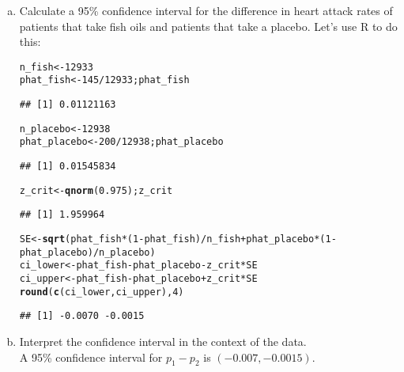 \documentclass[12pt, fleqn]{article}\usepackage[]{graphicx}\usepackage[]{color}
\makeatletter
\newcommand{\hlnum}[1]{\textcolor[rgb]{0.686,0.059,0.569}{#1}}%
\newcommand{\hlopt}[1]{\textcolor[rgb]{0,0,0}{#1}}%
\newcommand{\hlstd}[1]{\textcolor[rgb]{0.345,0.345,0.345}{#1}}%
\newcommand{\hlkwb}[1]{\textcolor[rgb]{0.69,0.353,0.396}{#1}}%
\newcommand{\hlkwd}[1]{\textcolor[rgb]{0.737,0.353,0.396}{\textbf{#1}}}%
\newenvironment{kframe}{%
 \def\at@end@of@kframe{}%
 \ifinner\ifhmode%
  \def\at@end@of@kframe{\end{minipage}}%
  \begin{minipage}{\columnwidth}%
 \fi\fi%
 \def\FrameCommand##1{\hskip\@totalleftmargin \hskip-\fboxsep
 \colorbox{shadecolor}{##1}\hskip-\fboxsep
     \hskip-\linewidth \hskip-\@totalleftmargin \hskip\columnwidth}%
 \MakeFramed {\advance\hsize-\width
   \@totalleftmargin\z@ \linewidth\hsize
   \@setminipage}}%
 {\par\unskip\endMakeFramed%
 \at@end@of@kframe}
\newenvironment{knitrout}{}{} %
\makeatother
\begin{document}
\begin{enumerate}[(a)]
\item Calculate a 95\% confidence interval for the difference in heart attack rates of patients that take fish oils and patients that take a placebo.  Let's use R to do this:
\begin{knitrout}\small
{}\color{fgcolor}\begin{kframe}
\begin{alltt}
\hlstd{n_fish} \hlkwb{<-} \hlnum{12933}
\hlstd{phat_fish} \hlkwb{<-} \hlnum{145} \hlopt{/} \hlnum{12933}\hlstd{; phat_fish}
\end{alltt}
\begin{verbatim}
## [1] 0.01121163
\end{verbatim}
\begin{alltt}
\hlstd{n_placebo} \hlkwb{<-} \hlnum{12938}
\hlstd{phat_placebo} \hlkwb{<-} \hlnum{200} \hlopt{/} \hlnum{12938}\hlstd{; phat_placebo}
\end{alltt}
\begin{verbatim}
## [1] 0.01545834
\end{verbatim}
\begin{alltt}
\hlstd{z_crit} \hlkwb{<-} \hlkwd{qnorm}\hlstd{(}\hlnum{0.975}\hlstd{); z_crit}
\end{alltt}
\begin{verbatim}
## [1] 1.959964
\end{verbatim}
\begin{alltt}
\hlstd{SE} \hlkwb{<-} \hlkwd{sqrt}\hlstd{(phat_fish}\hlopt{*}\hlstd{(}\hlnum{1}\hlopt{-}\hlstd{phat_fish)}\hlopt{/}\hlstd{n_fish} \hlopt{+} \hlstd{phat_placebo}\hlopt{*}\hlstd{(}\hlnum{1}\hlopt{-}\hlstd{phat_placebo)}\hlopt{/}\hlstd{n_placebo)}
\hlstd{ci_lower} \hlkwb{<-} \hlstd{phat_fish} \hlopt{-} \hlstd{phat_placebo} \hlopt{-} \hlstd{z_crit} \hlopt{*} \hlstd{SE}
\hlstd{ci_upper} \hlkwb{<-} \hlstd{phat_fish} \hlopt{-} \hlstd{phat_placebo} \hlopt{+} \hlstd{z_crit} \hlopt{*} \hlstd{SE}
\hlkwd{round}\hlstd{(}\hlkwd{c}\hlstd{(ci_lower, ci_upper),} \hlnum{4}\hlstd{)}
\end{alltt}
\begin{verbatim}
## [1] -0.0070 -0.0015
\end{verbatim}
\end{kframe}
\end{knitrout}
\item Interpret the confidence interval in the context of the data.\\

{\color{blue}
A 95\% confidence interval for $p_1 - p_2$ is $(-0.007, -0.0015)$.\\

}
\end{enumerate}
\end{document}
